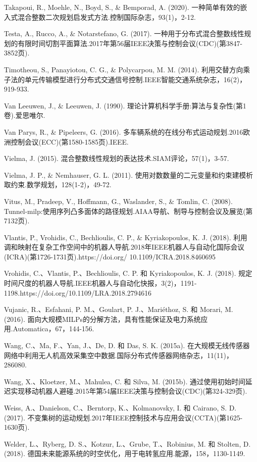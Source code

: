 \documentclass[10pt]{article}
\begin{document}
Takapoui, R., Moehle, N., Boyd, S., \& Bemporad, A. (2020). 一种简单有效的嵌入式混合整数二次规划启发式方法.控制国际杂志，93(1)，2-12.

Testa, A., Rucco, A., \& Notarstefano, G. (2017). 一种用于分布式混合整数线性规划的有限时间切割平面算法.2017年第56届IEEE决策与控制会议(CDC)(第3847-3852页).

Timotheou, S., Panayiotou, C. G., \& Polycarpou, M. M. (2014). 利用交替方向乘子法的单元传输模型进行分布式交通信号控制.IEEE智能交通系统杂志，16(2)，919-933.

Van Leeuwen, J., \& Leeuwen, J. (1990). 理论计算机科学手册:算法与复杂性(第1卷).爱思唯尔.

Van Parys, R., \& Pipeleers, G. (2016). 多车辆系统的在线分布式运动规划.2016欧洲控制会议(ECC)(第1580-1585页).IEEE.

Vielma, J. (2015). 混合整数线性规划的表达技术.SIAM评论，57(1)，3-57.

Vielma, J. P., \& Nemhauser, G. L. (2011). 使用对数数量的二元变量和约束建模析取约束.数学规划，128(1-2)，49-72.

Vitus, M., Pradeep, V., Hoffmann, G., Waslander, S., \& Tomlin, C. (2008). Tunnel-milp:使用序列凸多面体的路径规划.AIAA导航、制导与控制会议及展览(第7132页).

Vlantis, P., Vrohidis, C., Bechlioulis, C. P., \& Kyriakopoulos, K. J. (2018). 利用调和映射在复杂工作空间中的机器人导航.2018年IEEE机器人与自动化国际会议(ICRA)(第1726-1731页).https://doi.org/ 10.1109/ICRA.2018.8460695

Vrohidis, C.、Vlantis, P.、Bechlioulis, C. P. 和 Kyriakopoulos, K. J. (2018). 规定时间尺度的机器人导航.IEEE机器人与自动化快报，3(2)，1191-1198.https://doi.org/10.1109/LRA.2018.2794616

Vujanic, R.、Esfahani, P. M.、Goulart, P. J.、Mariéthoz, S. 和 Morari, M. (2016). 面向大规模MILPs的分解方法，具有性能保证及电力系统应用.Automatica，67，144-156.

Wang, C.、Ma, F.、Yan, J.、De, D. 和 Das, S. K. (2015a). 在大规模无线传感器网络中利用无人机高效采集空中数据.国际分布式传感器网络杂志，11(11)，286080.

Wang, X.、Kloetzer, M.、Mahulea, C. 和 Silva, M. (2015b). 通过使用初始时间延迟实现移动机器人避碰.2015年第54届IEEE决策与控制会议(CDC)(第324-329页).

Weiss, A.、Danielson, C.、Berntorp, K.、Kolmanovsky, I. 和 Cairano, S. D. (2017). 不变集树的运动规划.2017年IEEE控制技术与应用会议(CCTA)(第1625-1630页).

Welder, L.、Ryberg, D. S.、Kotzur, L.、Grube, T.、Robinius, M. 和 Stolten, D. (2018). 德国未来能源系统的时空优化，用于电转氢应用.能源，158，1130-1149.
\end{document}
